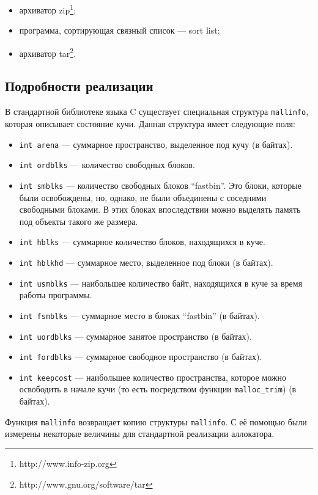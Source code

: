 \begin{itemize}
\item архиватор zip\footnote{http://www.info-zip.org};
\item программа, сортирующая связный список --- sort list;
\item архиватор tar\footnote{http://www.gnu.org/software/tar}.
\end{itemize}
   
\subsection{Подробности реализации}
   
В стандартной библиотеке языка C существует специальная структура \texttt{mallinfo}, которая описывает состояние кучи. 
Данная структура имеет следующие поля: 

\begin{itemize}
\item \texttt{int arena} --- суммарное пространство, выделенное под кучу (в байтах).
\item \texttt{int ordblks} --- количество свободных блоков.
\item \texttt{int smblks} --- количество свободных блоков ``fastbin''. Это блоки, которые были освобождены, но,
однако, не были объединены с соседними свободными блоками. В этих блоках впоследствии можно 
выделять память под объекты такого же размера.
\item \texttt{int hblks} --- суммарное количество блоков, находящихся в куче.
\item \texttt{int hblkhd} --- суммарное место, выделенное под блоки (в байтах).
\item \texttt{int usmblks} --- наибольшее количество байт, находящихся в куче за время работы программы.
\item \texttt{int fsmblks} --- суммарное место в блоках ``fastbin'' (в байтах).
\item \texttt{int uordblks} --- суммарное занятое пространство (в байтах).
\item \texttt{int fordblks} --- суммарное свободное пространство (в байтах).
\item \texttt{int keepcost} --- наибольшее количество пространства, которое можно освободить в начале кучи 
(то есть посредством функции \texttt{malloc\_trim}) (в байтах).
\end{itemize}
   
Функция \texttt{mallinfo} возвращает копию структуры \texttt{mallinfo}. С её помощью были измерены некоторые величины 
для стандартной реализации аллокатора. 

